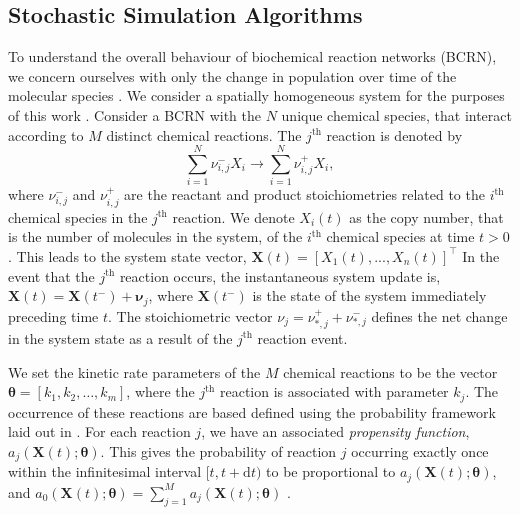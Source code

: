 \subsection{Stochastic Simulation Algorithms}
To understand the overall behaviour of biochemical reaction networks (BCRN), we concern ourselves with only the change in population over time of the molecular species \cite{gillespieExactStochasticSimulation1977,highamModelingSimulatingChemical2008, warneSimulationInferenceAlgorithms2019, wilkinsonStochasticModellingQuantitative2009}. We consider a spatially homogeneous system for the purposes of this work \cite{chenStochasticModelingSimulation2017}. Consider a BCRN with the $N$ unique chemical species, that interact according to $M$ distinct chemical reactions. The $j^{\text{th}}$ reaction is denoted by
\begin{equation}
	\sum_{i=1}^{N} \nu_{i,j}^- X_i\rightarrow\sum_{i=1}^{N} \nu_{i,j}^+ X_i,
\end{equation}
where $\nu_{i,j}^-$ and $\nu_{i,j}^+$ are the reactant and product stoichiometries related to the $i^\text{th}$ chemical species in the $j^\text{th}$ reaction. We denote $X_i(t)$ as the copy number, that is the number of molecules in the system, of the $i^{\text{th}}$ chemical species at time $t>0$. This leads to the system state vector, $\mathbf{X}(t) = [X_1(t),...,X_n(t)]^\intercal$
In the event that the $j^\text{th}$ reaction occurs, the instantaneous system update is, $\mathbf{X}(t) = \mathbf{X}(t^-)+\boldsymbol{\nu}_j$, where $\mathbf{X}(t^-)$ is the state of the system immediately preceding time $t$. The stoichiometric vector $\nu_j = \nu_{*,j}^+ + \nu_{*,j}^-$ defines the net change in the system state as a result of the $j^\text{th}$ reaction event.

We set the kinetic rate parameters of the $M$ chemical reactions to be the vector $\boldsymbol{\theta} = [k_1, k_2, \hdots, k_m]$, where the $j^{\text{th}}$ reaction is associated with parameter $k_j$. The occurrence of these reactions are based defined using the probability framework laid out in \cite{gillespieExactStochasticSimulation1977, gillespieChemicalLangevinEquation2000}. For each reaction $j$, we have an associated \textit{propensity function}, $a_j(\mathbf{X}(t) ; \boldsymbol{\theta})$. This gives the probability of reaction $j$ occurring exactly once within the infinitesimal interval $[t,t+\mathrm{d}t)$ to be proportional to $a_j(\mathbf{X}(t) ; \boldsymbol{\theta})$, and $a_0(\mathbf{X}(t) ; \boldsymbol{\theta}) = \sum_{j=1}^{M} a_j(\mathbf{X}(t) ; \boldsymbol{\theta})$ \cite{highamModelingSimulatingChemical2008, warneSimulationInferenceAlgorithms2019}.

